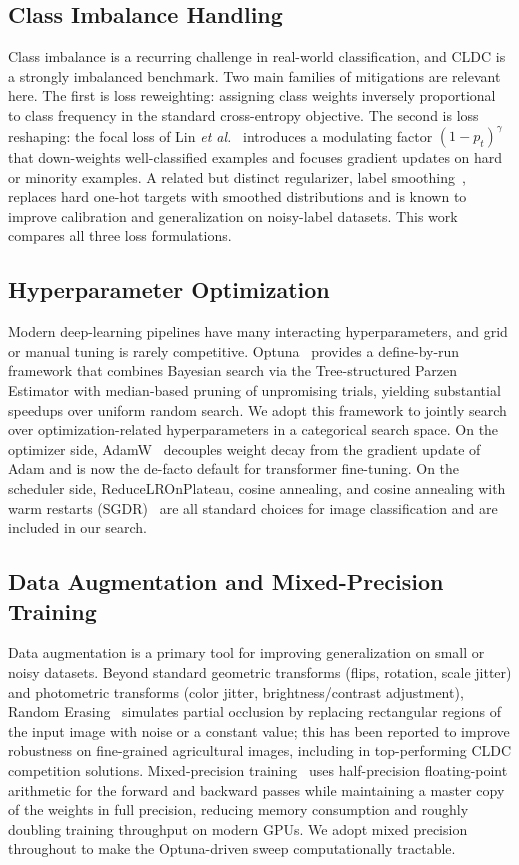 \documentclass[conference]{IEEEtran}
\begin{document}
\subsection{Class Imbalance Handling}
Class imbalance is a recurring challenge in real-world classification, and CLDC is a strongly imbalanced benchmark. Two main families of mitigations are relevant here. The first is loss reweighting: assigning class weights inversely proportional to class frequency in the standard cross-entropy objective. The second is loss reshaping: the focal loss of Lin \emph{et al.}~\cite{lin2017focal} introduces a modulating factor $(1-p_t)^\gamma$ that down-weights well-classified examples and focuses gradient updates on hard or minority examples. A related but distinct regularizer, label smoothing~\cite{szegedy2016label}, replaces hard one-hot targets with smoothed distributions and is known to improve calibration and generalization on noisy-label datasets. This work compares all three loss formulations.

\subsection{Hyperparameter Optimization}
Modern deep-learning pipelines have many interacting hyperparameters, and grid or manual tuning is rarely competitive. Optuna~\cite{akiba2019optuna} provides a define-by-run framework that combines Bayesian search via the Tree-structured Parzen Estimator with median-based pruning of unpromising trials, yielding substantial speedups over uniform random search. We adopt this framework to jointly search over optimization-related hyperparameters in a categorical search space. On the optimizer side, AdamW~\cite{loshchilov2019adamw} decouples weight decay from the gradient update of Adam and is now the de-facto default for transformer fine-tuning. On the scheduler side, ReduceLROnPlateau, cosine annealing, and cosine annealing with warm restarts (SGDR)~\cite{loshchilov2017sgdr} are all standard choices for image classification and are included in our search.

\subsection{Data Augmentation and Mixed-Precision Training}
Data augmentation is a primary tool for improving generalization on small or noisy datasets. Beyond standard geometric transforms (flips, rotation, scale jitter) and photometric transforms (color jitter, brightness/contrast adjustment), Random Erasing~\cite{zhong2020randomerasing} simulates partial occlusion by replacing rectangular regions of the input image with noise or a constant value; this has been reported to improve robustness on fine-grained agricultural images, including in top-performing CLDC competition solutions. Mixed-precision training~\cite{micikevicius2018mixed} uses half-precision floating-point arithmetic for the forward and backward passes while maintaining a master copy of the weights in full precision, reducing memory consumption and roughly doubling training throughput on modern GPUs. We adopt mixed precision throughout to make the Optuna-driven sweep computationally tractable.
\end{document}
